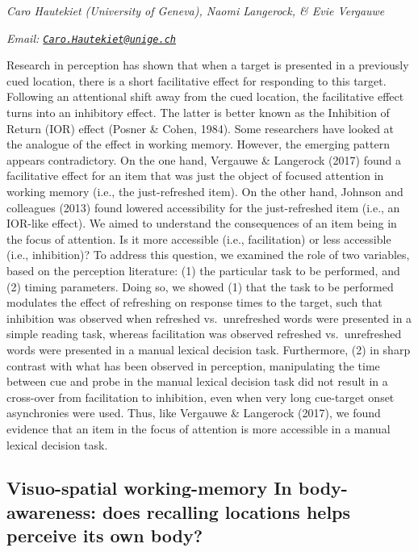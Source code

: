 \documentclass[
  12pt,
]{book}
\begin{document}
\emph{Caro Hautekiet (University of Geneva), Naomi Langerock, \& Evie Vergauwe}

\emph{Email: \href{mailto:Caro.Hautekiet@unige.ch}{\nolinkurl{Caro.Hautekiet@unige.ch}}}

Research in perception has shown that when a target is presented in a previously cued location, there is a short facilitative effect for responding to this target. Following an attentional shift away from the cued location, the facilitative effect turns into an inhibitory effect. The latter is better known as the Inhibition of Return (IOR) effect (Posner \& Cohen, 1984). Some researchers have looked at the analogue of the effect in working memory. However, the emerging pattern appears contradictory. On the one hand, Vergauwe \& Langerock (2017) found a facilitative effect for an item that was just the object of focused attention in working memory (i.e., the just-refreshed item). On the other hand, Johnson and colleagues (2013) found lowered accessibility for the just-refreshed item (i.e., an IOR-like effect). We aimed to understand the consequences of an item being in the focus of attention. Is it more accessible (i.e., facilitation) or less accessible (i.e., inhibition)? To address this question, we examined the role of two variables, based on the perception literature: (1) the particular task to be performed, and (2) timing parameters. Doing so, we showed (1) that the task to be performed modulates the effect of refreshing on response times to the target, such that inhibition was observed when refreshed vs.~unrefreshed words were presented in a simple reading task, whereas facilitation was observed refreshed vs.~unrefreshed words were presented in a manual lexical decision task. Furthermore, (2) in sharp contrast with what has been observed in perception, manipulating the time between cue and probe in the manual lexical decision task did not result in a cross-over from facilitation to inhibition, even when very long cue-target onset asynchronies were used. Thus, like Vergauwe \& Langerock (2017), we found evidence that an item in the focus of attention is more accessible in a manual lexical decision task.

\hypertarget{visuo-spatial-working-memory-in-body-awareness-does-recalling-locations-helps-perceive-its-own-body}{%
\subsection{Visuo-spatial working-memory In body-awareness: does recalling locations helps perceive its own body?}\label{visuo-spatial-working-memory-in-body-awareness-does-recalling-locations-helps-perceive-its-own-body}}
\end{document}

